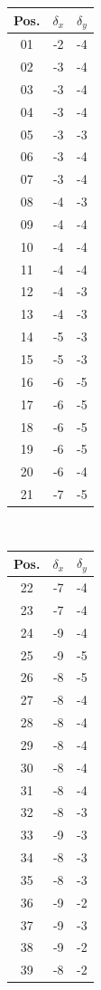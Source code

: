 \documentclass[pdftex,12pt,a4paper]{report}
\begin{document}
\begin{appendices}
\begin{table}[H]
\centering
\begin{tabular}[t]{ c | c | c }
\hline
Pos. & $\delta_x$ & $\delta_y$
\\
\hline\hline
01 & -2 & -4
\\
02 & -3 & -4
\\
03 & -3 & -4
\\
04 & -3 & -4
\\
05 & -3 & -3
\\
06 & -3 & -4
\\
07 & -3 & -4
\\
08 & -4 & -3
\\
09 & -4 & -4
\\
10 & -4 & -4
\\
11 & -4 & -4
\\
12 & -4 & -3
\\
13 & -4 & -3
\\
14 & -5 & -3
\\
15 & -5 & -3
\\
16 & -6 & -5
\\
17 & -6 & -5
\\
18 & -6 & -5
\\
19 & -6 & -5
\\
20 & -6 & -4
\\
21 & -7 & -5
\\
\hline
\end{tabular}
~
\begin{tabular}[t]{ c | c | c }
\hline
Pos. & $\delta_x$ & $\delta_y$
\\
\hline\hline
22 & -7 & -4
\\
23 & -7 & -4
\\
24 & -9 & -4
\\
25 & -9 & -5
\\
26 & -8 & -5
\\
27 & -8 & -4
\\
28 & -8 & -4
\\
29 & -8 & -4
\\
30 & -8 & -4
\\
31 & -8 & -4
\\
32 & -8 & -3
\\
33 & -9 & -3
\\
34 & -8 & -3
\\
35 & -8 & -3
\\
36 & -9 & -2
\\
37 & -9 & -3
\\
38 & -9 & -2
\\
39 & -8 & -2

\end{tabular}
\end{table}
\end{appendices}
\end{document}
